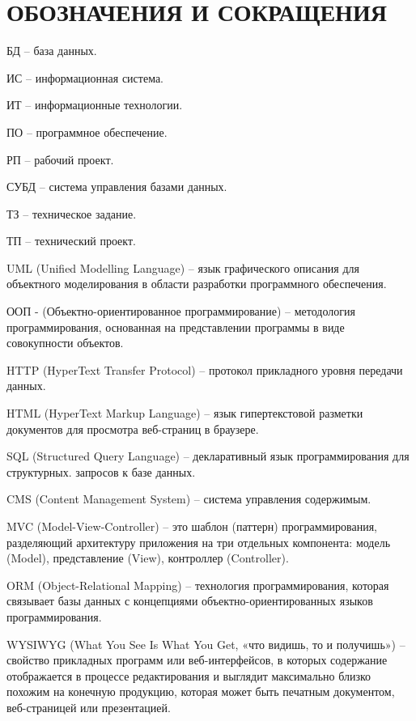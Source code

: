 \section*{ОБОЗНАЧЕНИЯ И СОКРАЩЕНИЯ}

БД -- база данных.

ИС -- информационная система.

ИТ -- информационные технологии. 



ПО -- программное обеспечение.

РП -- рабочий проект.

СУБД -- система управления базами данных.

ТЗ -- техническое задание.

ТП -- технический проект.

UML (Unified Modelling Language) -- язык графического описания для объектного моделирования в области разработки программного обеспечения.

ООП - (Объектно-ориентированное программирование) -- методология программирования, основанная на представлении программы в виде совокупности объектов.

HTTP (HyperText Transfer Protocol) -- протокол прикладного уровня передачи данных.

HTML (HyperText Markup Language) -- язык гипертекстовой разметки документов для просмотра веб-страниц в браузере.

SQL (Structured Query Language) -- декларативный язык программирования для структурных. запросов к базе данных.

CMS (Content Management System) -- система управления содержимым.

MVC (Model-View-Controller) -- это шаблон (паттерн) программирования, разделяющий архитектуру приложения на три отдельных компонента: модель (Model), представление (View), контроллер (Controller).

ORM (Object-Relational Mapping) -- технология программирования, которая связывает базы данных с концепциями объектно-ориентированных языков программирования.

WYSIWYG (What You See Is What You Get, «что видишь, то и получишь») -- свойство прикладных программ или веб-интерфейсов, в которых содержание отображается в процессе редактирования и выглядит максимально близко похожим на конечную продукцию, которая может быть печатным документом, веб-страницей или презентацией.
